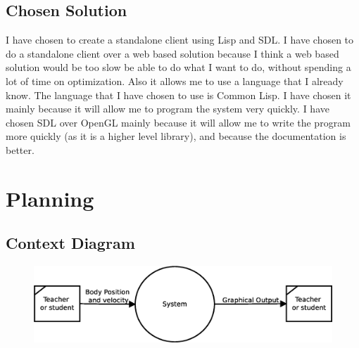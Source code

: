 \subsection{Chosen Solution}
I have chosen to create a standalone client using Lisp and SDL\@. I have chosen
to do a standalone client over a web based solution because I think a web based
solution would be too slow be able to do what I want to do, without spending a
lot of time on optimization. Also it allows me to use a language that I already
know. The language that I have chosen to use is Common Lisp. I have chosen it
mainly because it will allow me to program the system very quickly. I have
chosen SDL over OpenGL mainly because it will allow me to write the program more
quickly (as it is a higher level library), and because the documentation is
better.

\section{Planning}

\subsection{Context Diagram}
\begin{figure}[h]
	\includegraphics[width=\textwidth]{./img/context.eps}
	\label{fig:context}
\end{figure}

